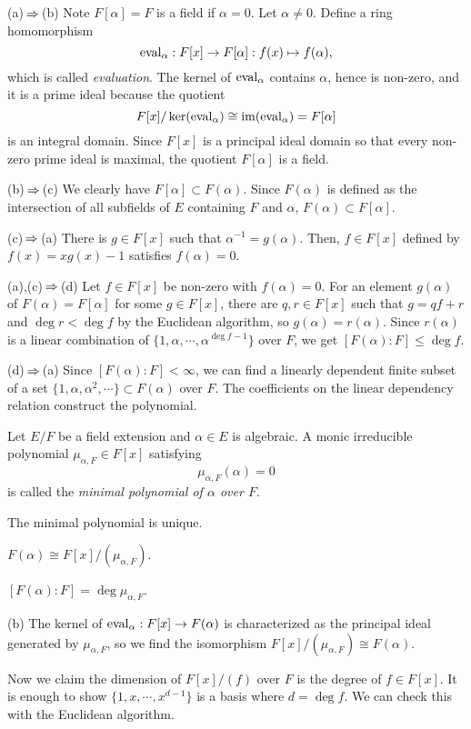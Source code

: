 \documentclass{../../large}
\begin{document}
\begin{pf}
(a)$\impl$(b)
Note $F[\alpha]=F$ is a field if $\alpha=0$.
Let $\alpha\ne0$.
Define a ring homomorphism
\[\operatorname{eval}_\alpha:F[x]\to F[\alpha]:f(x)\mapsto f(\alpha),\]
which is called \emph{evaluation}.
The kernel of $\operatorname{eval}_\alpha$ contains $\alpha$, hence is non-zero, and it is a prime ideal because the quotient
\[F[x]/\ker(\operatorname{eval}_\alpha)\cong\operatorname{im}(\operatorname{eval}_\alpha)=F[\alpha]\]
is an integral domain.
Since $F[x]$ is a principal ideal domain so that every non-zero prime ideal is maximal, the quotient $F[\alpha]$ is a field.

(b)$\impl$(c)
We clearly have $F[\alpha]\subset F(\alpha)$.
Since $F(\alpha)$ is defined as the intersection of all subfields of $E$ containing $F$ and $\alpha$, $F(\alpha)\subset F[\alpha]$.

(c)$\impl$(a)
There is $g\in F[x]$ such that $\alpha^{-1}=g(\alpha)$.
Then, $f\in F[x]$ defined by $f(x)=xg(x)-1$ satisfies $f(\alpha)=0$.

(a),(c)$\impl$(d)
Let $f\in F[x]$ be non-zero with $f(\alpha)=0$.
For an element $g(\alpha)$ of $F(\alpha)=F[\alpha]$ for some $g\in F[x]$, there are $q,r\in F[x]$ such that $g=qf+r$ and $\deg r<\deg f$ by the Euclidean algorithm, so $g(\alpha)=r(\alpha)$.
Since $r(\alpha)$ is a linear combination of $\{1,\alpha,\cdots,\alpha^{\deg f-1}\}$ over $F$, we get $[F(\alpha):F]\le\deg f$.

(d)$\impl$(a)
Since $[F(\alpha):F]<\infty$, we can find a linearly dependent finite subset of a set $\{1,\alpha,\alpha^2,\cdots\}\subset F(\alpha)$ over $F$.
The coefficients on the linear dependency relation construct the polynomial.
\end{pf}

\begin{prb}
Let $E/F$ be a field extension and $\alpha\in E$ is algebraic.
A monic irreducible polynomial $\mu_{\alpha,F}\in F[x]$ satisfying 
\[\mu_{\alpha,F}(\alpha)=0\]
is called the \emph{minimal polynomial of $\alpha$ over $F$}.
\begin{parts}
\item The minimal polynomial is unique.
\item $F(\alpha)\cong F[x]/(\mu_{\alpha,F})$.
\item $[F(\alpha):F]=\deg\mu_{\alpha,F}$.
\end{parts}
\end{prb}
\begin{pf}
(b)
The kernel of $\operatorname{eval}_\alpha:F[x]\to F(\alpha)$ is characterized as the principal ideal generated by $\mu_{\alpha,F}$, so we find the isomorphism $F[x]/(\mu_{\alpha,F})\cong F(\alpha)$.

Now we claim the dimension of $F[x]/(f)$ over $F$ is the degree of $f\in F[x]$.
It is enough to show $\{1,x,\cdots,x^{d-1}\}$ is a basis where $d=\deg f$.
We can check this with the Euclidean algorithm.
\end{pf}
\end{document}
